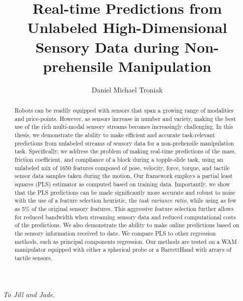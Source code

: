 \documentclass[msc,oneside]{ubcthesis}
\title{Real-time Predictions from Unlabeled High-Dimensional Sensory Data during Non-prehensile Manipulation}
\author{Daniel Michael Troniak}
\begin{document}
\frontmatter
\maketitle                      %

\begin{abstract}                %
Robots can be readily equipped with sensors that span a growing range of modalities and
price-points.  
However, as sensors increase in number and variety, making the best use of the rich multi-modal sensory streams becomes increasingly challenging. 
In this thesis, we demonstrate the ability to make efficient and accurate task-relevant predictions from unlabeled streams of sensory data for a non-prehensile manipulation task. Specifically, we address the problem of making real-time predictions of the mass, friction coefficient, and compliance of a block during a topple-slide task, using an unlabeled mix of 1650 features composed of pose, velocity, force, torque, and tactile sensor data samples taken during the motion. 
Our framework employs a partial least squares (PLS) estimator as computed based on training data. 
Importantly, we show that the PLS predictions can be made significantly more accurate and robust to noise with the use of a feature selection heuristic, the {\em task variance ratio}, while using as few as 5\% of the original sensory features. 
This aggressive feature selection further allows for reduced bandwidth when streaming sensory data and reduced computational costs of the predictions. 
We also demonstrate the ability to make online predictions based on the sensory information received to date. We compare PLS to other regression methods, such as principal components regression. 
Our methods are tested on a WAM manipulator equipped with either a spherical probe or a BarrettHand with arrays of tactile sensors.
\end{abstract}



\tableofcontents                %
\listoftables                   %
\listoffigures                  %



\chapter[Dedication]{} %
\emph{To Jill and Jade.}

\mainmatter %







%




\appendix

%

\backmatter

\end{document}

